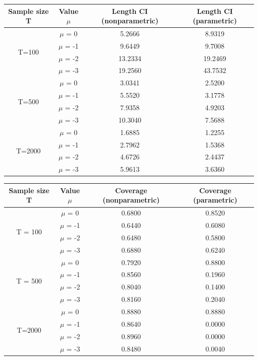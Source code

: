 \documentclass[12pt]{article}
\begin{document}
\newpage


\begin{center}
\begin{tabular}{||c | c | c c||} 
 \hline
 Sample size T & Value $\mu$ & Length CI (nonparametric) & Length CI (parametric) \\ [0.5ex] 
 \hline\hline
 \multirow{4}{4em}{T=100} & $\mu$ = 0 & 5.2666 & 8.9319\\ 
& $\mu$ = -1 & 9.6449 & 9.7008 \\ 
& $\mu$ = -2 & 13.2334 & 19.2469 \\ 
& $\mu$ = -3 & 19.2560 & 43.7532 \\ 
 \hline
 \multirow{4}{4em}{T=500} & $\mu$ = 0 & 3.0341 & 2.5200\\ 
& $\mu$ = -1 & 5.5520 & 3.1778 \\ 
& $\mu$ = -2 & 7.9358 & 4.9203 \\ 
& $\mu$ = -3 & 10.3040 & 7.5688 \\ 
 \hline
 \multirow{4}{4em}{T=2000} & $\mu$ = 0 & 1.6885 & 1.2255\\ 
& $\mu$ = -1 & 2.7962 & 1.5368 \\ 
& $\mu$ = -2 & 4.6726 & 2.4437 \\ 
& $\mu$ = -3 & 5.9613 & 3.6360 \\ 
 \hline
\end{tabular}
\end{center}

\begin{center}
\begin{tabular}{||c | c | c c||} 
 \hline
 Sample size T & Value $\mu$ & Coverage (nonparametric) & Coverage (parametric) \\ [0.5ex] 
 \hline\hline
 \multirow{4}{4em}{T = 100} & $\mu$ = 0 & 0.6800 & 0.8520\\ 
& $\mu$ = -1 & 0.6440 & 0.6080 \\ 
& $\mu$ = -2 & 0.6480 & 0.5800 \\ 
& $\mu$ = -3 & 0.6880 & 0.6240 \\ 
 \hline
 \multirow{4}{4em}{T = 500} & $\mu$ = 0 & 0.7920 & 0.8800\\ 
& $\mu$ = -1 & 0.8560 & 0.1960 \\ 
& $\mu$ = -2 & 0.8040 & 0.1400 \\ 
& $\mu$ = -3 & 0.8160 & 0.2040 \\ 
 \hline
 \multirow{4}{4em}{T=2000} & $\mu$ = 0 & 0.8880 & 0.8880\\ 
& $\mu$ = -1 & 0.8640 & 0.0000 \\ 
& $\mu$ = -2 & 0.8960 & 0.0000 \\ 
& $\mu$ = -3 & 0.8480 & 0.0040 \\ 
 \hline
\end{tabular}
\end{center}
\end{document}
